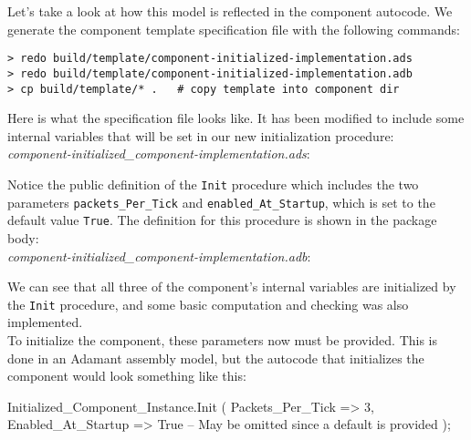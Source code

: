Let's take a look at how this model is reflected in the component autocode. We generate the component template specification file with the following commands:

\vspace{5mm} %
\begin{verbatim}
> redo build/template/component-initialized-implementation.ads
> redo build/template/component-initialized-implementation.adb
> cp build/template/* .   # copy template into component dir
\end{verbatim}
\vspace{5mm} %

Here is what the specification file looks like. It has been modified to include some internal variables that will be set in our new initialization procedure: \\

\textit{component-initialized\_component-implementation.ads}:

Notice the public definition of the \texttt{Init} procedure which includes the two parameters \texttt{packets\_Per\_Tick} and \texttt{enabled\_At\_Startup}, which is set to the default value \texttt{True}. The definition for this procedure is shown in the package body: \\

\textit{component-initialized\_component-implementation.adb}:

We can see that all three of the component's internal variables are initialized by the \texttt{Init} procedure, and some basic computation and checking was also implemented. \\

To initialize the component, these parameters now must be provided. This is done in an Adamant assembly model, but the autocode that initializes the component would look something like this:

\vspace{5mm} %
\begin{adacode}
  Initialized_Component_Instance.Init (
    Packets_Per_Tick => 3,
    Enabled_At_Startup => True -- May be omitted since a default is provided
  );
\end{adacode}
\vspace{5mm} %

